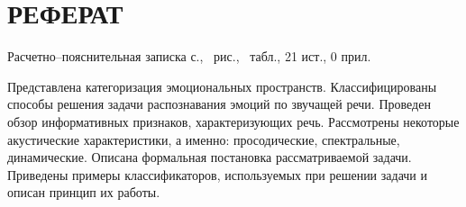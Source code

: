 \part*{РЕФЕРАТ}

Расчетно--пояснительная записка \pageref{LastPage} с., \totalfigures\ рис., \totaltables\ табл., 21 ист., 0 прил.

Представлена категоризация эмоциональных пространств. Классифицированы способы решения задачи распознавания эмоций по звучащей речи. Проведен обзор информативных признаков, характеризующих речь. Рассмотрены некоторые акустические характеристики, а именно: просодические, спектральные, динамические. Описана формальная постановка рассматриваемой задачи. Приведены примеры классификаторов, используемых при решении задачи и описан принцип их работы.
